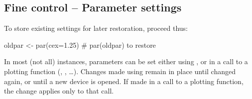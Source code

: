 \subsection{Fine control -- Parameter settings}\label{ss:fine}
\begin{marginfigure}[24pt]
  To store existing settings for later restoration, proceed thus:
\begin{Schunk}
\begin{Sinput}
oldpar <- par(cex=1.25)
  # par(oldpar) to restore
\end{Sinput}
\end{Schunk}
\end{marginfigure}
In most (not all) instances, parameters can be set either using
, or in a call to a plotting function (,
, \ldots).  Changes made using  remain in
place until changed again, or until a new device is opened.  If made
in a call to a plotting function, the change applies only to that
call.

